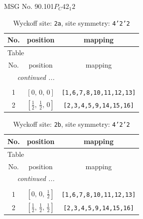 \documentclass[fleqn,8pt]{jsarticle}
\begin{document}
\setcounter{MaxMatrixCols}{32}

\renewcommand{\tablename}{Table~}
\renewcommand{\figurename}{Figure~}
\begin{center}
\LARGE
MSG No. 90.101\quad$P_{C}42_{1}2$
\end{center}
\renewcommand{\arraystretch}{1.2}
\begin{longtable}{ccc}
\caption{Wyckoff site: {\tt 2a}, site symmetry: {\tt 4'2'2}}
 \\
 \hline \hline
No. & position & mapping \\ \hline \endfirsthead

\multicolumn{2}{l}{\tablename\ \thetable{}} \\
 \hline \hline
No. & position & mapping \\ \hline \endhead

 \hline \hline
\multicolumn{2}{r}{\footnotesize\it continued ...} \\ \endfoot

 \hline \hline
\multicolumn{2}{r}{} \\ \endlastfoot

1 & $\left[ 0,\, 0,\, 0 \right]$ & {\tt [1,6,7,8,10,11,12,13]} \\ \hline
2 & $\left[ \frac{1}{2},\, \frac{1}{2},\, 0 \right]$ & {\tt [2,3,4,5,9,14,15,16]} \\
\end{longtable}
\renewcommand{\arraystretch}{1.2}
\begin{longtable}{ccc}
\caption{Wyckoff site: {\tt 2b}, site symmetry: {\tt 4'2'2}}
 \\
 \hline \hline
No. & position & mapping \\ \hline \endfirsthead

\multicolumn{2}{l}{\tablename\ \thetable{}} \\
 \hline \hline
No. & position & mapping \\ \hline \endhead

 \hline \hline
\multicolumn{2}{r}{\footnotesize\it continued ...} \\ \endfoot

 \hline \hline
\multicolumn{2}{r}{} \\ \endlastfoot

1 & $\left[ 0,\, 0,\, \frac{1}{2} \right]$ & {\tt [1,6,7,8,10,11,12,13]} \\ \hline
2 & $\left[ \frac{1}{2},\, \frac{1}{2},\, \frac{1}{2} \right]$ & {\tt [2,3,4,5,9,14,15,16]} \\
\end{longtable}
\end{document}
